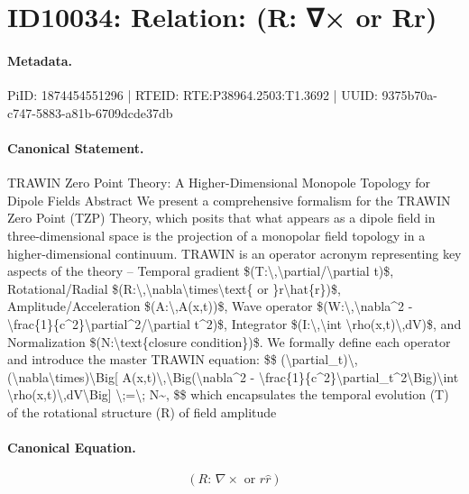 \section*{ID10034: Relation: (R: ∇× or Rr)}
\paragraph{Metadata.}
PiID: 1874454551296 | RTEID: RTE:P38964.2503:T1.3692 | UUID: 9375b70a-c747-5883-a81b-6709dcde37db

\paragraph{Canonical Statement.}
TRAWIN Zero Point Theory: A Higher-Dimensional Monopole Topology for Dipole Fields Abstract We present a comprehensive formalism for the TRAWIN Zero Point (TZP) Theory, which posits that what appears as a dipole field in three-dimensional space is the projection of a monopolar field topology in a higher-dimensional continuum. TRAWIN is an operator acronym representing key aspects of the theory – Temporal gradient \$(T:\textbackslash{},\textbackslash{}partial/\textbackslash{}partial t)\$, Rotational/Radial \$(R:\textbackslash{},\textbackslash{}nabla\textbackslash{}times\textbackslash{}text\{ or \}r\textbackslash{}hat\{r\})\$, Amplitude/Acceleration \$(A:\textbackslash{},A(x,t))\$, Wave operator \$(W:\textbackslash{},\textbackslash{}nabla\textasciicircum{}2 - \textbackslash{}frac\{1\}\{c\textasciicircum{}2\}\textbackslash{}partial\textasciicircum{}2/\textbackslash{}partial t\textasciicircum{}2)\$, Integrator \$(I:\textbackslash{},\textbackslash{}int \textbackslash{}rho(x,t)\textbackslash{},dV)\$, and Normalization \$(N:\textbackslash{}text\{closure condition\})\$. We formally define each operator and introduce the master TRAWIN equation: \$\$ (\textbackslash{}partial\_t)\textbackslash{},(\textbackslash{}nabla\textbackslash{}times)\textbackslash{}Big[ A(x,t)\textbackslash{},\textbackslash{}Big(\textbackslash{}nabla\textasciicircum{}2 - \textbackslash{}frac\{1\}\{c\textasciicircum{}2\}\textbackslash{}partial\_t\textasciicircum{}2\textbackslash{}Big)\textbackslash{}int \textbackslash{}rho(x,t)\textbackslash{},dV\textbackslash{}Big] \textbackslash{};=\textbackslash{}; N\textasciitilde{}, \$\$ which encapsulates the temporal evolution (T) of the rotational structure (R) of field amplitude

\paragraph{Canonical Equation.}
\[
(R:\,\nabla\times\text{ or }r\hat{r})
\]

